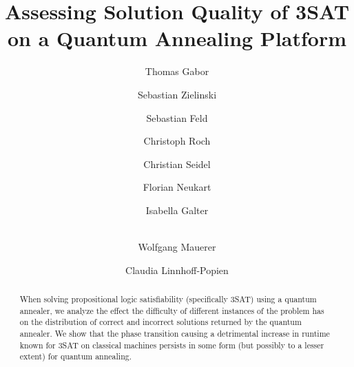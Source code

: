 \documentclass[runningheads]{llncs}
\begin{document}
%
\title{Assessing Solution Quality of 3SAT\\on a Quantum Annealing Platform}
%
%
\author{Thomas Gabor \and
Sebastian Zielinski \and
Sebastian Feld \and
Christoph Roch \and
Christian Seidel \and
Florian Neukart \and
Isabella Galter \and\\
Wolfgang Mauerer \and
Claudia Linnhoff-Popien}
%
%
%
\maketitle              %
%
\begin{abstract}
When solving propositional logic satisfiability (specifically 3SAT) using a quantum annealer, we analyze the effect the difficulty of different instances of the problem has on the distribution of correct and incorrect solutions returned by the quantum annealer. We show that the phase transition causing a detrimental increase in runtime known for 3SAT on classical machines persists in some form (but possibly to a lesser extent) for quantum annealing.

\end{abstract}
%
%
%






%
%
%


%
\end{document}
